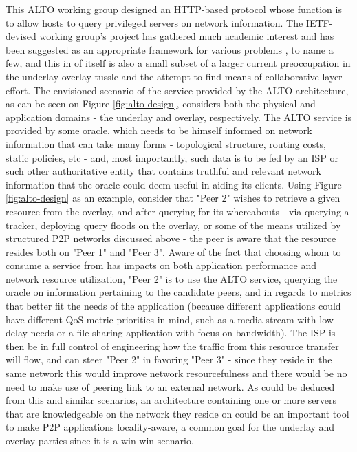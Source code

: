     This ALTO working group designed an HTTP-based protocol whose function is to allow hosts to query privileged servers on network information.
    The IETF-devised working group's project has gathered much academic interest \cite{seedorf2009} \cite{provider-aided-cdn} \cite{sampaio2018} \cite{liao2014} \cite{dan-Commag10} and has been suggested as an appropriate framework for various problems \cite{fps-12} \cite{pfa-10} \cite{wichtlhuber2017} \cite{cdni-problem-statement}, to name a few, and this in of itself is also a small subset of a larger current preoccupation in the underlay-overlay tussle and the attempt to find means of collaborative layer effort.
    The envisioned scenario of the service provided by the ALTO architecture, as can be seen on Figure \ref{fig:alto-design}, considers both the physical and application domains - the underlay and overlay, respectively.
    The ALTO service is provided by some oracle, which needs to be himself informed on network information that can take many forms - topological structure, routing costs, static policies, etc - and, most importantly, such data is to be fed by an ISP or such other authoritative entity that contains truthful and relevant network information that the oracle could deem useful in aiding its clients.
    Using Figure \ref{fig:alto-design} as an example, consider that "Peer 2" wishes to retrieve a given resource from the overlay, and after querying for its whereabouts - via querying a tracker, deploying query floods on the overlay, or some of the means utilized by structured P2P networks discussed above - the peer is aware that the resource resides both on "Peer 1" and "Peer 3".
    Aware of the fact that choosing whom to consume a service from has impacts on both application performance and network resource utilization, "Peer 2" is to use the ALTO service, querying the oracle on information pertaining to the candidate peers, and in regards to metrics that better fit the needs of the application (because different applications could have different QoS metric priorities in mind, such as a media stream with low delay needs or a file sharing application with focus on bandwidth).
    The ISP is then be in full control of engineering how the traffic from this resource transfer will flow, and can steer "Peer 2" in favoring "Peer 3" - since they reside in the same network this would improve network resourcefulness and there would be no need to make use of peering link to an external network.
    As could be deduced from this and similar scenarios, an architecture containing one or more servers that are knowledgeable on the network they reside on could be an important tool to make P2P applications locality-aware, a common goal for the underlay and overlay parties since it is a win-win scenario.

